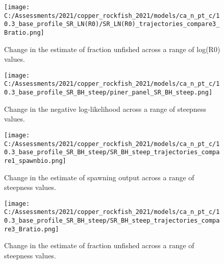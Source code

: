 \documentclass[11pt,
  english,
  a4paper,
]{article}
\begin{document}
\begin{figure}
\centering
\texttt{[image: C:/Assessments/2021/copper\_rockfish\_2021/models/ca\_n\_pt\_c/10.3\_base\_profile\_SR\_LN(R0)/SR\_LN(R0)\_trajectories\_compare3\_Bratio.png]}
\caption{Change in the estimate of fraction unfished across a range of log(R0) values.\label{fig:r0-depl}}
\end{figure}

\tagmcend\tagstructend


\begin{figure}
\centering
\texttt{[image: C:/Assessments/2021/copper\_rockfish\_2021/models/ca\_n\_pt\_c/10.3\_base\_profile\_SR\_BH\_steep/piner\_panel\_SR\_BH\_steep.png]}
\caption{Change in the negative log-likelihood across a range of steepness values.\label{fig:h-profile}}
\end{figure}

\tagmcend\tagstructend


\begin{figure}
\centering
\texttt{[image: C:/Assessments/2021/copper\_rockfish\_2021/models/ca\_n\_pt\_c/10.3\_base\_profile\_SR\_BH\_steep/SR\_BH\_steep\_trajectories\_compare1\_spawnbio.png]}
\caption{Change in the estimate of spawning output across a range of steepness values.\label{fig:h-ssb}}
\end{figure}

\tagmcend\tagstructend


\begin{figure}
\centering
\texttt{[image: C:/Assessments/2021/copper\_rockfish\_2021/models/ca\_n\_pt\_c/10.3\_base\_profile\_SR\_BH\_steep/SR\_BH\_steep\_trajectories\_compare3\_Bratio.png]}
\caption{Change in the estimate of fraction unfished across a range of steepness values.\label{fig:h-depl}}
\end{figure}

\tagmcend\tagstructend
\end{document}
